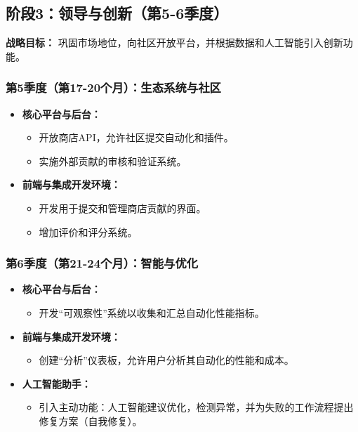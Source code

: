 \documentclass[11pt, a4paper, oneside]{article}
\begin{document}
\clearpage



\subsection{阶段3：领导与创新（第5-6季度）}
\textbf{战略目标：} 巩固市场地位，向社区开放平台，并根据数据和人工智能引入创新功能。

\subsubsection*{第5季度（第17-20个月）：生态系统与社区}
\begin{itemize}[leftmargin=*]
    \item \textbf{核心平台与后台：}
    \begin{itemize}
        \item 开放商店API，允许社区提交自动化和插件。
        \item 实施外部贡献的审核和验证系统。
    \end{itemize}
    \item \textbf{前端与集成开发环境：}
    \begin{itemize}
        \item 开发用于提交和管理商店贡献的界面。
        \item 增加评价和评分系统。
    \end{itemize}
\end{itemize}

\subsubsection*{第6季度（第21-24个月）：智能与优化}
\begin{itemize}[leftmargin=*]
    \item \textbf{核心平台与后台：}
    \begin{itemize}
        \item 开发“可观察性”系统以收集和汇总自动化性能指标。
    \end{itemize}
    \item \textbf{前端与集成开发环境：}
    \begin{itemize}
        \item 创建“分析”仪表板，允许用户分析其自动化的性能和成本。
    \end{itemize}
    \item \textbf{人工智能助手：}
    \begin{itemize}
        \item 引入主动功能：人工智能建议优化，检测异常，并为失败的工作流程提出修复方案（自我修复）。
    \end{itemize}
\end{itemize}
\end{document}
